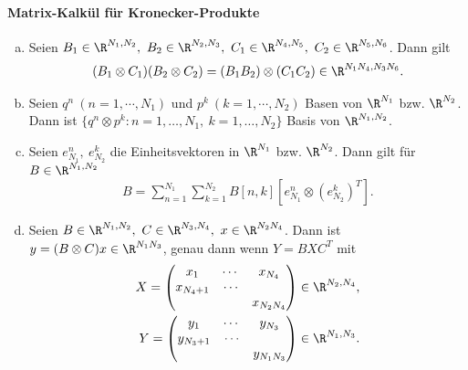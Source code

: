 \paragraph{Matrix-Kalkül für Kronecker-Produkte}


\begin{enumerate}[a)]
    \item
      Seien
      $B_1 \in \R^{N_1, N_2}, \ B_2 \in \R^{N_2, N_3}, \ C_1 \in\R^{N_4, N_5},
      \ C_2 \in \R^{N_5, N_6}$.
      Dann gilt
      \begin{eqnarray*}
          (B_1 \otimes C_1) (B_2 \otimes C_2) = (B_1 B_2) \otimes
          (C_1 C_2) \in \R^{N_1 N_4, N_3 N_6}.
      \end{eqnarray*}
    \item
      Seien $q^n \ (n = 1, \cdots, N_1)$ und $p^k \ (k = 1, \cdots, N_2)$ Basen
      von $\R^{N_1}$ bzw. $\R^{N_2}$. Dann ist $\{q^n \otimes p^k : n=1,\dots,N_1,\ k=1,\dots,N_2\}$ Basis von
      $\R^{N_1, N_2}$.
    \item
      Seien $e^n_{N_1}, \ e^k_{N_2}$ die Einheitsvektoren in $\R^{N_1}$ bzw.
      $\R^{N_2}$.
      Dann gilt für $B \in \R^{N_1, N_2}$
      \begin{eqnarray*}
          B = \sum_{n=1}^{N_1} \sum_{k=1}^{N_2} B[n, k] \left[e^n_{N_1}
          \otimes \left(e^k_{N_2}\right)^T\right].
      \end{eqnarray*}
    \item
      Seien $B \in \R^{N_1, N_2}, \ C \in \R^{N_3, N_4}, \ x \in \R^{N_2 N_4}$.
      Dann ist $y = (B \otimes C) x \in \R^{N_1 N_3}$, genau dann wenn
      $Y = BXC^T$ mit
      \begin{eqnarray*}
          X = \begin{pmatrix}
                x_1 & \cdots & x_{N_4} \\
                x_{N_4+1} & \cdots \\
                & & x_{N_2 N_4}
              \end{pmatrix} \in \R^{N_2, N_4}, \\
          Y = \begin{pmatrix}
                y_1 & \cdots & y_{N_3} \\
                y_{N_3+1} & \cdots \\
                & & y_{N_1 N_3}
              \end{pmatrix} \in \R^{N_1, N_3}.
      \end{eqnarray*}
\end{enumerate}


